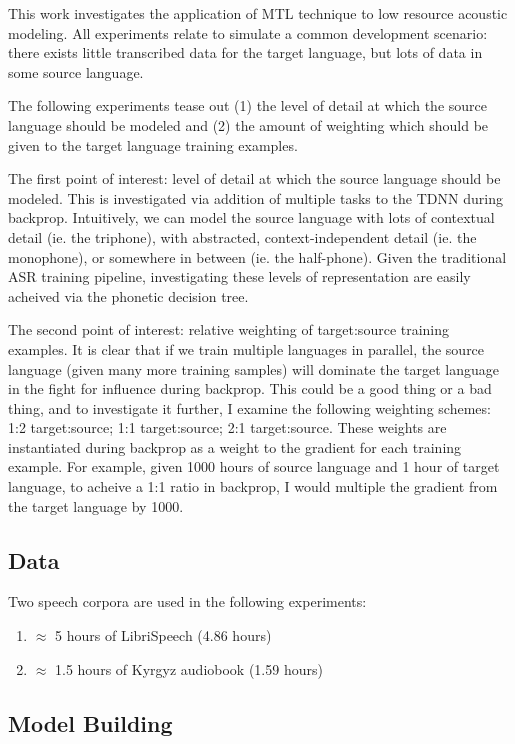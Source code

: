 \documentclass[a4paper]{article}
\begin{document}
This work investigates the application of MTL technique to low resource acoustic modeling. All experiments relate to simulate a common development scenario: there exists little transcribed data for the target language, but lots of data in some source language.

The following experiments tease out (1) the level of detail at which the source language should be modeled and (2) the amount of weighting which should be given to the target language training examples.

The first point of interest: level of detail at which the source language should be modeled. This is investigated via addition of multiple tasks to the TDNN during backprop. Intuitively, we can model the source language with lots of contextual detail (ie. the triphone), with abstracted, context-independent detail (ie. the monophone), or somewhere in between (ie. the half-phone). Given the traditional ASR training pipeline, investigating these levels of representation are easily acheived via the phonetic decision tree.

The second point of interest: relative weighting of target:source training examples. It is clear that if we train multiple languages in parallel, the source language (given many more training samples) will dominate the target language in the fight for influence during backprop. This could be a good thing or a bad thing, and to investigate it further, I examine the following weighting schemes: 1:2 target:source; 1:1 target:source; 2:1 target:source. These weights are instantiated during backprop as a weight to the gradient for each training example. For example, given 1000 hours of source language and 1 hour of target language, to acheive a 1:1 ratio in backprop, I would multiple the gradient from the target language by 1000. 



\subsection{Data}

Two speech corpora are used in the following experiments:

\begin{enumerate}
\item $\approx$ 5 hours of LibriSpeech (4.86 hours)
\item $\approx$ 1.5 hours of Kyrgyz audiobook (1.59 hours)
\end{enumerate}

\subsection{Model Building}
\end{document}
